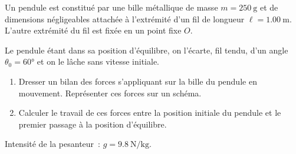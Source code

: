Un pendule est constitué par une bille métallique de masse $m=\qty{250}{\g}$ et
de dimensions négligeables attachée à l'extrémité d'un fil de longueur
$\ell=\qty{1.00}{\m}$. L'autre extrémité du fil est fixée en un point fixe $O$.

Le pendule étant dans sa position d'équilibre, on l'écarte, fil tendu, d'un
angle $\theta_0=\ang{60}$ et on le lâche sans vitesse initiale.
\begin{enumerate}
    \item Dresser un bilan des forces s'appliquant sur la bille du pendule en
          mouvement. Représenter ces forces sur un schéma.
    \item Calculer le travail de ces forces entre la position initiale du
          pendule et le premier passage à la position d'équilibre.
\end{enumerate}
\begin{donnees}
    Intensité de la pesanteur~: $g=\qty{9.8}{\N\per\kg}$.
\end{donnees}
